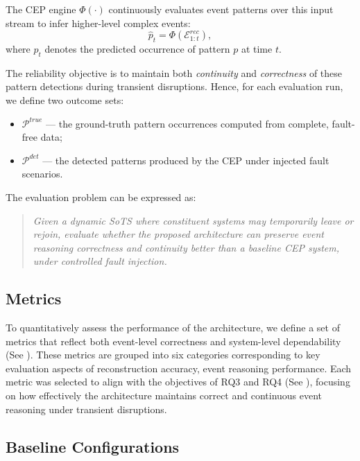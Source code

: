 The CEP engine $\Phi(\cdot)$ continuously evaluates event patterns over this input stream to infer higher-level complex events:
\begin{equation}
    \hat{p}_t = \Phi(\mathcal{E}_{1:t}^{rec}),
\end{equation}
where $\hat{p}_t$ denotes the predicted occurrence of pattern $p$ at time $t$.

\smallskip
The reliability objective is to maintain both \textit{continuity} and \textit{correctness} of these pattern detections during transient disruptions.  
Hence, for each evaluation run, we define two outcome sets:
\begin{itemize}[noitemsep, topsep=0pt]
    \item $\mathcal{P}^{true}$ — the ground-truth pattern occurrences computed from complete, fault-free data;
    \item $\mathcal{P}^{det}$ — the detected patterns produced by the CEP under injected fault scenarios.
\end{itemize}


The evaluation problem can be expressed as:
\begin{quote}
\textit{Given a dynamic SoTS where constituent systems may temporarily leave or rejoin, evaluate whether the proposed architecture can preserve event reasoning correctness and continuity better than a baseline CEP system, under controlled fault injection.}
\end{quote}


\subsection{Metrics}\label{subsec:metrics}

To quantitatively assess the performance of the architecture, we define a set of metrics that reflect both event-level correctness and system-level dependability (See ). These metrics are grouped into six categories corresponding to key evaluation aspects of reconstruction accuracy, event reasoning performance. Each metric was selected to align with the objectives of RQ3 and RQ4 (See ), focusing on how effectively the architecture maintains correct and continuous event reasoning under transient disruptions. 




\subsection{Baseline Configurations}
\label{subsec:results-eval-baselines}

